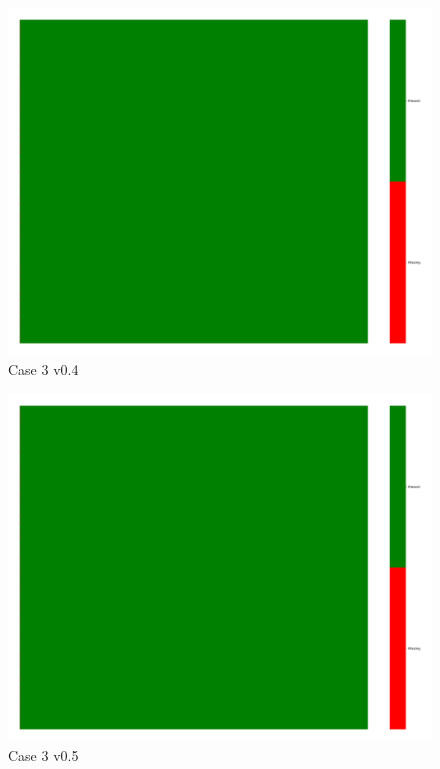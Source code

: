 \documentclass[a4paper,12pt]{article}
\begin{document}
\begin{figure}[H]
    \includegraphics[width=\linewidth]{case3_v0.4_heatmap_cleaned.png}
    \caption*{Case 3 v0.4}
\end{figure}

\begin{figure}[H]
    \includegraphics[width=\linewidth]{case3_v0.5_heatmap_cleaned.png}
    \caption*{Case 3 v0.5}
\end{figure}
\end{document}
